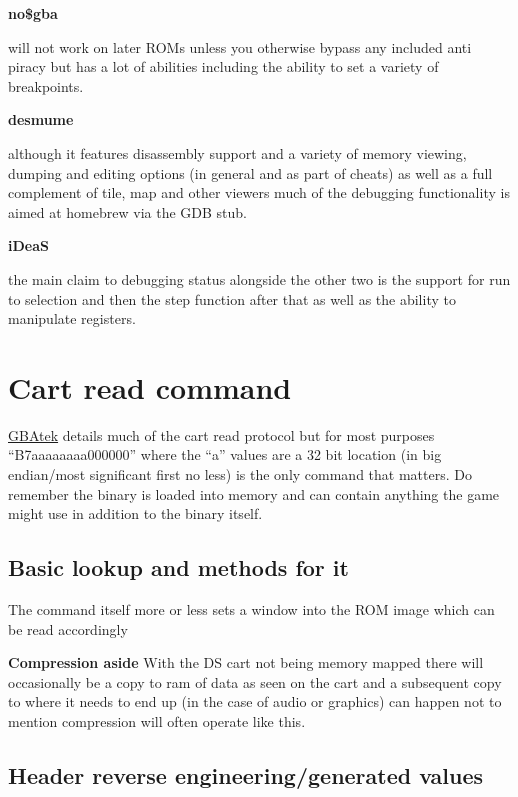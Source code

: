 \documentclass[
]{book}
\begin{document}
\textbf{no\$gba}

will not work on later ROMs unless you otherwise bypass any included anti piracy but has a lot of abilities including the ability to set a variety of breakpoints.

\textbf{desmume}

although it features disassembly support and a variety of memory viewing, dumping and editing options (in general and as part of cheats) as well as a full complement of tile, map and other viewers much of the debugging functionality is aimed at homebrew via the GDB stub.

\textbf{iDeaS}

the main claim to debugging status alongside the other two is the support for run to selection and then the step function after that as well as the ability to manipulate registers.

\hypertarget{cart-read-command}{%
\section{Cart read command}\label{cart-read-command}}

\href{http://problemkaputt.de/gbatek.htm\#dscartridgeprotocol}{GBAtek} details much of the cart read protocol but for most purposes ``B7aaaaaaaa000000'' where the ``a'' values are a 32 bit location (in big endian/most significant first no less) is the only command that matters. Do remember the binary is loaded into memory and can contain anything the game might use in addition to the binary itself.

\hypertarget{basic-lookup-and-methods-for-it}{%
\subsection{Basic lookup and methods for it}\label{basic-lookup-and-methods-for-it}}

The command itself more or less sets a window into the ROM image which can be read accordingly

\textbf{Compression aside} With the DS cart not being memory mapped there will occasionally be a copy to ram of data as seen on the cart and a subsequent copy to where it needs to end up (in the case of audio or graphics) can happen not to mention compression will often operate like this.

\hypertarget{header-reverse-engineeringgenerated-values}{%
\subsection{Header reverse engineering/generated values}\label{header-reverse-engineeringgenerated-values}}
\end{document}
